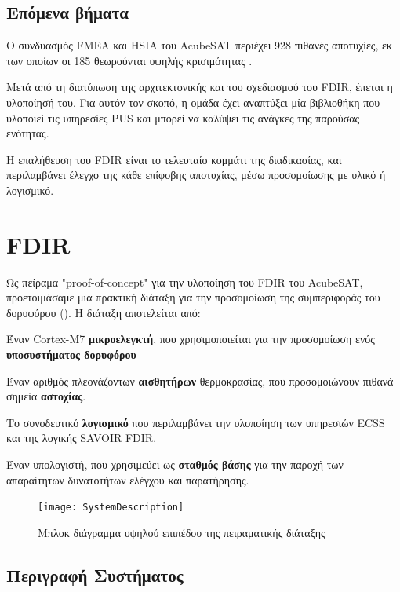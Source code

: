 \documentclass[a4paper,nobib]{tufte-book}
\begin{document}
\section{Επόμενα βήματα}
Ο συνδυασμός \acs{FMEA} και \acs{HSIA} του AcubeSAT περιέχει 928 πιθανές αποτυχίες, εκ των οποίων οι 185 θεωρούνται υψηλής κρισιμότητας \autocite{retselis_acubesat_fmea_2020}.

Μετά από τη διατύπωση της αρχιτεκτονικής και του σχεδιασμού του \acs{FDIR}, έπεται η υλοποίησή του. Για αυτόν τον σκοπό, η ομάδα έχει αναπτύξει μία βιβλιοθήκη που υλοποιεί τις υπηρεσίες \acs{PUS} και μπορεί να καλύψει τις ανάγκες της παρούσας ενότητας.

Η επαλήθευση του \acs{FDIR} είναι το τελευταίο κομμάτι της διαδικασίας, και περιλαμβάνει έλεγχο της κάθε επίφοβης αποτυχίας, μέσω προσομοίωσης με υλικό ή λογισμικό.

\chapter{ \acs{FDIR}}
\label{cap:practical}

Ως πείραμα "proof-of-concept" για την υλοποίηση του \ac{FDIR} του AcubeSAT, προετοιμάσαμε μια πρακτική διάταξη για την προσομοίωση της συμπεριφοράς του δορυφόρου (). Η διάταξη αποτελείται από:
\begin{compactitem}
	\item Έναν Cortex-M7 \textbf{μικροελεγκτή}, που χρησιμοποιείται για την προσομοίωση ενός \textbf{υποσυστήματος δορυφόρου}
	\item Έναν αριθμός πλεονάζοντων \textbf{αισθητήρων} θερμοκρασίας, που προσομοιώνουν πιθανά σημεία \textbf{αστοχίας}.
	\item Το συνοδευτικό \textbf{λογισμικό} που περιλαμβάνει την υλοποίηση των υπηρεσιών \ac{ECSS} και της λογικής \ac{SAVOIR} \ac{FDIR}.
	\item Έναν υπολογιστή, που χρησιμεύει ως \textbf{σταθμός βάσης} για την παροχή των απαραίτητων δυνατοτήτων ελέγχου και παρατήρησης.
\end{compactitem}

\begin{figure}[h]
	\texttt{[image: SystemDescription]}
	\caption{Μπλοκ διάγραμμα υψηλού επιπέδου της πειραματικής διάταξης}
	\label{fig:block}
\end{figure}
\section{Περιγραφή Συστήματος}
\end{document}
